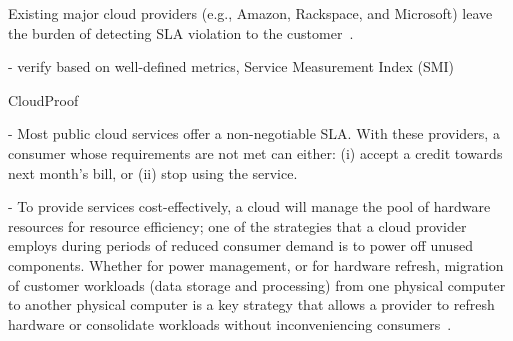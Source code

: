 Existing major cloud providers (e.g., Amazon, Rackspace, and Microsoft) leave the burden of detecting SLA violation to the customer~\cite{Bas12}.

- verify based on well-defined metrics, Service Measurement Index (SMI)

CloudProof~\cite{PLM+11}


- Most public cloud services offer a non-negotiable SLA. With these providers, a consumer whose requirements are not met can either: (i) accept a credit towards next month's bill, or (ii) stop using the service.

- To provide services cost-effectively, a cloud will manage the pool of hardware resources for resource efficiency; one of the strategies that a cloud provider employs during periods of reduced consumer demand is to power off unused components. Whether for power management, or for hardware refresh, migration of customer workloads (data storage and processing) from one physical computer to another physical computer is a key strategy that allows a provider to refresh hardware or consolidate workloads without inconveniencing consumers~\cite{BGP+12}.
